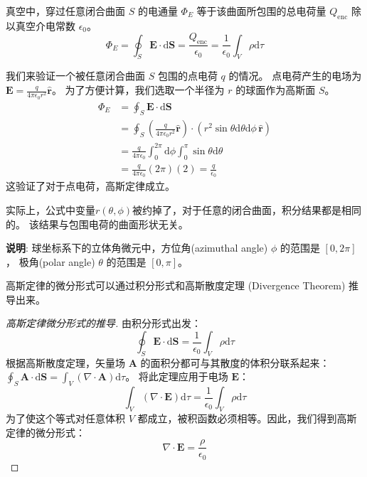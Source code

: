 \documentclass[fontset=none]{ctexart}
\begin{document}
\begin{law}
    真空中，穿过任意闭合曲面 $S$ 的电通量 $\Phi_E$ 等于该曲面所包围的总电荷量 $Q_{\text{enc}}$ 
    除以真空介电常数 $\epsilon_0$。
    \begin{equation}
        \Phi_E = \oint_S \bm{E} \cdot \mathrm{d}\bm{S} = \frac{Q_{\text{enc}}}{\epsilon_0} 
        = \frac{1}{\epsilon_0} \int_V \rho \mathrm{d}\tau
    \end{equation}
\end{law}

\begin{example}[点电荷的电通量]
    我们来验证一个被任意闭合曲面 $S$ 包围的点电荷 $q$ 的情况。
    点电荷产生的电场为 $\bm{E} = \frac{q}{4\pi\epsilon_0 r^2} \hat{\bm{r}}$。
    为了方便计算，我们选取一个半径为 $r$ 的球面作为高斯面 $S$。
    \begin{equation}
    \begin{aligned}
        \Phi_E &= \oint_S \bm{E} \cdot \mathrm{d}\bm{S} \\
        &= \oint_S \left(\frac{q}{4\pi\epsilon_0 r^2} \hat{\bm{r}}\right) 
        \cdot (r^2 \sin\theta \mathrm{d}\theta \mathrm{d}\phi \, \hat{\bm{r}}) \\
        &= \frac{q}{4\pi\epsilon_0} \int_{0}^{2\pi} \mathrm{d}\phi 
        \int_{0}^{\pi} \sin\theta \mathrm{d}\theta \\
        &= \frac{q}{4\pi\epsilon_0} (2\pi) (2) = \frac{q}{\epsilon_0}
    \end{aligned}
    \end{equation}
    这验证了对于点电荷，高斯定律成立。

    实际上，公式中变量$r(\theta, \phi)$被约掉了，对于任意的闭合曲面，积分结果都是相同的。
    该结果与包围电荷的曲面形状无关。

    \textbf{说明}: 球坐标系下的立体角微元中，方位角(azimuthal angle) $\phi$ 的范围是 $[0, 2\pi]$，
    极角(polar angle) $\theta$ 的范围是 $[0, \pi]$。
\end{example}

高斯定律的微分形式可以通过积分形式和高斯散度定理 (Divergence Theorem) 推导出来。
\begin{proof}[高斯定律微分形式的推导]
    由积分形式出发：
    \begin{equation}
        \oint_S \bm{E} \cdot \mathrm{d}\bm{S} = \frac{1}{\epsilon_0} \int_V \rho \mathrm{d}\tau
    \end{equation}
    根据高斯散度定理，矢量场 $\bm{A}$ 的面积分都可与其散度的体积分联系起来： 
    $\oint_S \bm{A} \cdot \mathrm{d}\bm{S} = \int_V (\nabla \cdot \bm{A}) \mathrm{d}\tau$。
    将此定理应用于电场 $\bm{E}$：
    \begin{equation}
        \int_V (\nabla \cdot \bm{E}) \mathrm{d}\tau = \frac{1}{\epsilon_0} \int_V \rho \mathrm{d}\tau
    \end{equation}
    为了使这个等式对任意体积 $V$ 都成立，被积函数必须相等。因此，我们得到高斯定律的微分形式：
    \begin{equation}
        \nabla \cdot \bm{E} = \frac{\rho}{\epsilon_0}
    \end{equation}
\end{proof}
\end{document}
